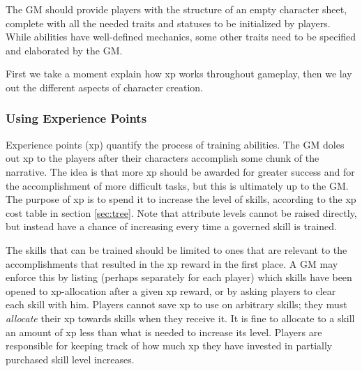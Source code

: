 \documentclass[12pt]{article}
\begin{document}
The GM should provide players with the structure of an empty character sheet,
complete with all the needed traits and statuses to be initialized by players.
While abilities have well-defined mechanics, some other traits
need to be specified and elaborated by the GM.

First we take a moment explain how xp works throughout gameplay,
then we lay out the different aspects of character creation.

\subsubsection{Using Experience Points}
Experience points (xp) quantify the process of training abilities.
The GM doles out xp to the players after their characters accomplish some chunk of the narrative.
The idea is that more xp should be awarded for greater success and for the accomplishment of more difficult tasks,
but this is ultimately up to the GM.
The purpose of xp is to spend it to increase the level of skills, according to the xp cost table in section \ref{sec:tree}.
Note that attribute levels cannot be raised directly, but instead have a chance of increasing every time a governed skill is trained.

The skills that can be trained should be limited to ones that are relevant to the accomplishments that resulted in the xp reward in the first place.
A GM may enforce this by listing 
(perhaps separately for each player)
which skills have been opened
to xp-allocation after a given xp reward,
or by asking players to clear each skill with him.
Players cannot save xp to use on arbitrary skills; they must \emph{allocate} their xp towards skills when they receive it.
It is fine to allocate to a skill an amount of xp less than what is needed to increase its level.
Players are responsible for keeping track of how much xp they have invested in partially purchased skill level increases.
\end{document}
